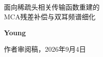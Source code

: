\documentclass[UTF8,a4paper]{article}
\begin{document}
\begin{center}
{\heiti{}面向稀疏头相关传输函数重建的\\MCA残差补偿与双耳频谱细化\par}
\vspace{1em}
{\kaishu{}\textbf{Young}\par}
\vspace{0.6em}
{\small 作者审阅稿，2026年9月4日\par}
\end{center}









\end{document}
